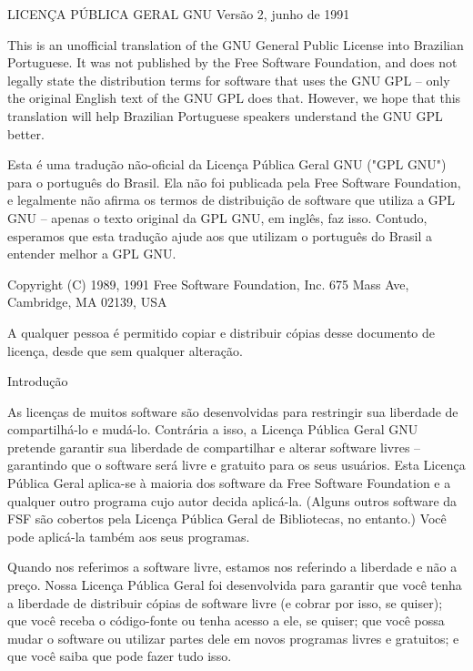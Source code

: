 {\small
\begin{center}
		      LICENÇA PÚBLICA GERAL GNU
		       Versão 2, junho de 1991
\end{center}

 This is an unofficial translation of the GNU General Public License
 into Brazilian Portuguese. It was not published by the Free Software
   Foundation, and does not legally state the distribution terms for
   software that uses the GNU GPL -- only the original English text of
   the GNU GPL does that. However, we hope that this translation will
  help Brazilian Portuguese speakers understand the GNU GPL better.

  Esta é uma tradução não-oficial da Licença Pública Geral GNU ("GPL
  GNU") para o português do Brasil. Ela não foi publicada pela Free
Software Foundation, e legalmente não afirma os termos de distribuição
 de software que utiliza a GPL GNU -- apenas o texto original da GPL
 GNU, em inglês, faz isso. Contudo, esperamos que esta tradução ajude
 aos que utilizam o português do Brasil a entender melhor a GPL GNU.

   Copyright (C) 1989, 1991 Free Software Foundation, Inc. 675 Mass Ave,
		        Cambridge, MA 02139, USA

A qualquer pessoa é permitido copiar e distribuir cópias desse
documento de licença, desde que sem qualquer alteração.
\begin{center}
			      Introdução
\end{center}

  As licenças de muitos software são desenvolvidas para restringir sua
liberdade de compartilhá-lo e mudá-lo. Contrária a isso, a Licença
Pública Geral GNU pretende garantir sua liberdade de compartilhar e
alterar software livres -- garantindo que o software será livre e
gratuito para os seus usuários. Esta Licença Pública Geral aplica-se à
maioria dos software da Free Software Foundation e a qualquer outro
programa cujo autor decida aplicá-la. (Alguns outros software da FSF
são cobertos pela Licença Pública Geral de Bibliotecas, no entanto.)
Você pode aplicá-la também aos seus programas.

  Quando nos referimos a software livre, estamos nos referindo a
liberdade e não a preço. Nossa Licença Pública Geral foi desenvolvida
para garantir que você tenha a liberdade de distribuir cópias de
software livre (e cobrar por isso, se quiser); que você receba o
código-fonte ou tenha acesso a ele, se quiser; que você possa mudar o
software ou utilizar partes dele em novos programas livres e
gratuitos; e que você saiba que pode fazer tudo isso.

}
